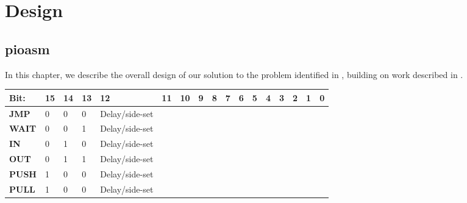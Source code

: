 \chapter{Design}
\label{ch:design}

\section{pioasm}
In this chapter, we describe the overall design of our solution to the problem identified in , building on work described in .
\begin{table}[]
    \begin{tabular}{|l|l|l|l|lllll|l|l|l|l|l|l|l|l|}
        \hline
        \textbf{Bit:} & 15 & 14 & 13 & \multicolumn{1}{l|}{12} & \multicolumn{1}{l|}{11} & \multicolumn{1}{l|}{10} & \multicolumn{1}{l|}{9} & 8         & 7         & 6         & 5         & 4         & 3         & 2         & 1         & 0         \\ \hline
        \textbf{JMP}  & 0  & 0  & 0  & Delay/side-set          &                         &                         &                        &           &           &           &           &           &           &           &           &           \\ \hline
        \textbf{WAIT} & 0  & 0  & 1  & Delay/side-set          &                         & \textbf{}               & \textbf{}              & \textbf{} & \textbf{} & \textbf{} & \textbf{} & \textbf{} & \textbf{} & \textbf{} & \textbf{} & \textbf{} \\ \hline
        \textbf{IN}   & 0  & 1  & 0  & Delay/side-set          &                         &                         &                        &           &           &           &           &           &           &           &           &           \\ \hline
        \textbf{OUT}  & 0  & 1  & 1  & Delay/side-set          &                         &                         &                        &           &           &           &           &           &           &           &           &           \\ \hline
        \textbf{PUSH} & 1  & 0  & 0  & Delay/side-set          &                         &                         &                        &           &           &           &           &           &           &           &           &           \\ \hline
        \textbf{PULL} & 1  & 0  & 0  & Delay/side-set          &                         &                         &                        &           &           &           &           &           &           &           &           &           \\ \hline

\end{tabular}
\end{table}
